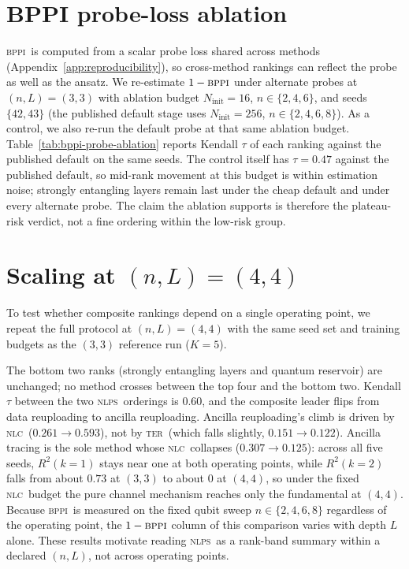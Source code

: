 \documentclass{article}
\newcommand{\nlc}{\textsc{nlc}}
\newcommand{\bppi}{\textsc{bppi}}
\newcommand{\ter}{\textsc{ter}}
\newcommand{\nlps}{\textsc{nlps}}
\begin{document}
\section{BPPI probe-loss ablation}
\label{app:bppi-probe-ablation}

\bppi\ is computed from a scalar probe loss shared across methods (Appendix~\ref{app:reproducibility}), so cross-method rankings can reflect the probe as well as the ansatz.
We re-estimate $1-\bppi$ under alternate probes at $(n,L)=(3,3)$ with ablation budget $N_{\mathrm{init}}=16$, $n\in\{2,4,6\}$, and seeds $\{42,43\}$ (the published default stage uses $N_{\mathrm{init}}=256$, $n\in\{2,4,6,8\}$).
As a control, we also re-run the default probe at that same ablation budget.
Table~\ref{tab:bppi-probe-ablation} reports Kendall $\tau$ of each ranking against the published default on the same seeds.
The control itself has $\tau = 0.47$ against the published default, so mid-rank movement at this budget is within estimation noise; strongly entangling layers remain last under the cheap default and under every alternate probe.
The claim the ablation supports is therefore the plateau-risk verdict, not a fine ordering within the low-risk group.



\section{Scaling at $(n,L)=(4,4)$}
\label{app:scaling-n4-l4}

To test whether composite rankings depend on a single operating point, we repeat the full protocol at $(n,L)=(4,4)$ with the same seed set and training budgets as the $(3,3)$ reference run ($K=5$).

The bottom two ranks (strongly entangling layers and quantum reservoir) are unchanged; no method crosses between the top four and the bottom two.
Kendall $\tau$ between the two \nlps\ orderings is $0.60$, and the composite leader flips from data reuploading to ancilla reuploading.
Ancilla reuploading's climb is driven by \nlc\ ($0.261 \rightarrow 0.593$), not by \ter\ (which falls slightly, $0.151 \rightarrow 0.122$).
Ancilla tracing is the sole method whose \nlc\ collapses ($0.307 \rightarrow 0.125$): across all five seeds, $R^2(k{=}1)$ stays near one at both operating points, while $R^2(k{=}2)$ falls from about $0.73$ at $(3,3)$ to about $0$ at $(4,4)$, so under the fixed \nlc\ budget the pure channel mechanism reaches only the fundamental at $(4,4)$.
Because \bppi\ is measured on the fixed qubit sweep $n\in\{2,4,6,8\}$ regardless of the operating point, the $1-\bppi$ column of this comparison varies with depth $L$ alone.
These results motivate reading \nlps\ as a rank-band summary within a declared $(n,L)$, not across operating points.
\end{document}
